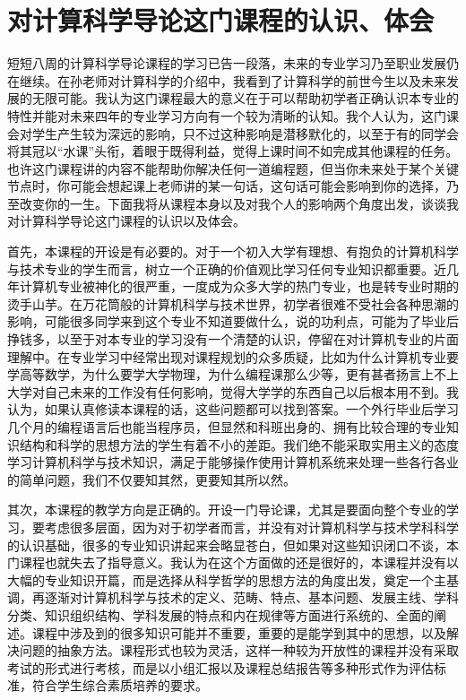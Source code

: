 \documentclass{article}
\begin{document}
\section{对计算科学导论这门课程的认识、体会}
短短八周的计算科学导论课程的学习已告一段落，未来的专业学习乃至职业发展仍在继续。在孙老师对计算科学的介绍中，我看到了计算科学的前世今生以及未来发展的无限可能。我认为这门课程最大的意义在于可以帮助初学者正确认识本专业的特性并能对未来四年的专业学习方向有一个较为清晰的认知。我个人认为，这门课会对学生产生较为深远的影响，只不过这种影响是潜移默化的，以至于有的同学会将其冠以“水课”头衔，着眼于既得利益，觉得上课时间不如完成其他课程的任务。也许这门课程讲的内容不能帮助你解决任何一道编程题，但当你未来处于某个关键节点时，你可能会想起课上老师讲的某一句话，这句话可能会影响到你的选择，乃至改变你的一生。下面我将从课程本身以及对我个人的影响两个角度出发，谈谈我对计算科学导论这门课程的认识以及体会。
\par
 首先，本课程的开设是有必要的。对于一个初入大学有理想、有抱负的计算机科学与技术专业的学生而言，树立一个正确的价值观比学习任何专业知识都重要。近几年计算机专业被神化的很严重，一度成为众多大学的热门专业，也是转专业时期的烫手山芋。在万花筒般的计算机科学与技术世界，初学者很难不受社会各种思潮的影响，可能很多同学来到这个专业不知道要做什么，说的功利点，可能为了毕业后挣钱多，以至于对本专业的学习没有一个清楚的认识，停留在对计算机专业的片面理解中。在专业学习中经常出现对课程规划的众多质疑，比如为什么计算机专业要学高等数学，为什么要学大学物理，为什么编程课那么少等，更有甚者扬言上不上大学对自己未来的工作没有任何影响，觉得大学学的东西自己以后根本用不到。我认为，如果认真修读本课程的话，这些问题都可以找到答案。一个外行毕业后学习几个月的编程语言后也能当程序员，但显然和科班出身的、拥有比较合理的专业知识结构和科学的思想方法的学生有着不小的差距。我们绝不能采取实用主义的态度学习计算机科学与技术知识，满足于能够操作使用计算机系统来处理一些各行各业的简单问题，我们不仅要知其然，更要知其所以然。
 
\par

其次，本课程的教学方向是正确的。开设一门导论课，尤其是要面向整个专业的学习，要考虑很多层面，因为对于初学者而言，并没有对计算机科学与技术学科科学的认识基础，很多的专业知识讲起来会略显苍白，但如果对这些知识闭口不谈，本门课程也就失去了指导意义。我认为在这个方面做的还是很好的，本课程并没有以大幅的专业知识开篇，而是选择从科学哲学的思想方法的角度出发，奠定一个主基调，再逐渐对计算机科学与技术的定义、范畴、特点、基本问题、发展主线、学科分类、知识组织结构、学科发展的特点和内在规律等方面进行系统的、全面的阐述。课程中涉及到的很多知识可能并不重要，重要的是能学到其中的思想，以及解决问题的抽象方法。课程形式也较为灵活，这样一种较为开放性的课程并没有采取考试的形式进行考核，而是以小组汇报以及课程总结报告等多种形式作为评估标准，符合学生综合素质培养的要求。\par
\end{document}
